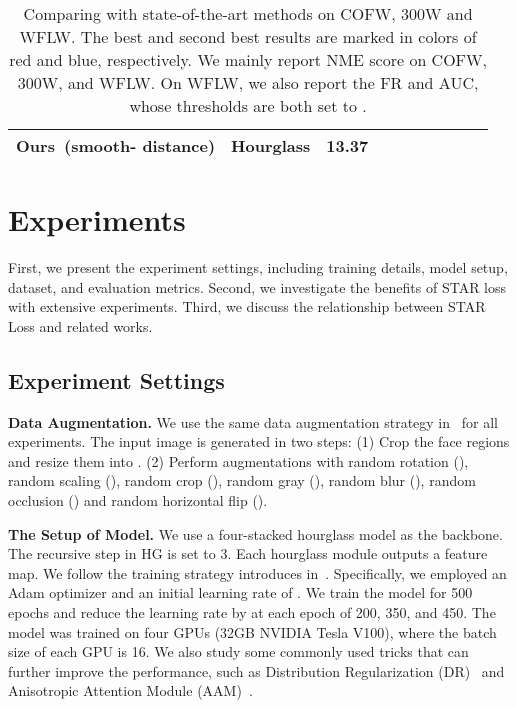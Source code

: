 \documentclass[10pt,twocolumn,letterpaper]{article}
\begin{document}
\begin{table*}[t]
\begin{tabular}{llcccccccc}
\midrule
Ours~\footnotesize{(smooth- distance)}       & Hourglass  & 13.37 & \textbf{\color{red}{4.02}} & \textbf{\color{red}{2.32}} & \textbf{\color{red}{0.605}} & \textbf{\color{red}{4.62}} & \textbf{\color{red}{2.87}} & \textbf{\color{red}{2.52}} & \textbf{\color{red}{4.32}} \\
\bottomrule
\end{tabular}\vspace{-0.5em}
\caption{Comparing with state-of-the-art methods on COFW, 300W and WFLW. 
The {\color{red}best} and {\color{blue}second best} results are marked in colors of red and blue, respectively.
We mainly report NME score on COFW, 300W, and WFLW. On WFLW, we also report the FR and AUC, whose thresholds are both set to .
}
\vspace{-1.0em}
\label{tab: exp-acc}
\end{table*}

\section{Experiments}
First, we present the experiment settings, including training details, model setup, dataset, and evaluation metrics. 
Second, we investigate the benefits of STAR loss with extensive experiments.
Third, we discuss the relationship between STAR Loss and related works.

\subsection{Experiment Settings}
\noindent\textbf{Data Augmentation.}
We use the same data augmentation strategy in~\cite{huang2021adnet} for all experiments. The input image is generated in two steps:
(1) Crop the face regions and resize them into . 
(2) Perform augmentations with random rotation (), random scaling (), random crop (), random gray (), random blur (), random occlusion () and random horizontal flip (). 

\noindent\textbf{The Setup of Model.}
We use a four-stacked hourglass model as the backbone. 
The recursive step in HG is set to 3.
Each hourglass module outputs a  feature map.
We follow the training strategy introduces in~\cite{huang2021adnet}. 
Specifically, we employed an Adam optimizer and an initial learning rate of .
We train the model for 500 epochs and reduce the learning rate by  at each epoch of 200, 350, and 450.
The model was trained on four GPUs (32GB NVIDIA Tesla V100), where the batch size of each GPU is 16.
We also study some commonly used tricks that can further improve the performance, such as Distribution Regularization (DR)~\cite{nibali2018numerical} and Anisotropic Attention Module (AAM)~\cite{huang2021adnet}.
\end{document}
